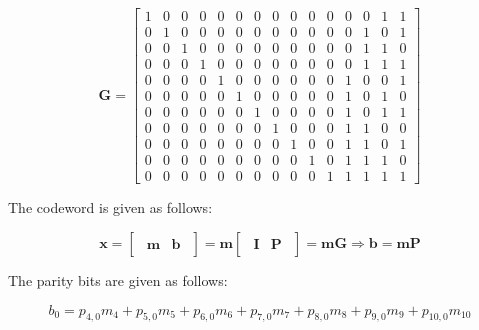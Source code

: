 \documentclass[fleqn]{article}
\begin{document}
\begin{enumerate}
\begin{enumerate}
			\begin{equation*}
				\mathbf{G} = \begin{bmatrix}
					1 & 0 & 0 & 0 & 0 & 0 & 0 & 0 & 0 & 0 & 0 & 0 & 0 & 1 & 1\\
					0 & 1 & 0 & 0 & 0 & 0 & 0 & 0 & 0 & 0 & 0 & 0 & 1 & 0 & 1\\
					0 & 0 & 1 & 0 & 0 & 0 & 0 & 0 & 0 & 0 & 0 & 0 & 1 & 1 & 0\\
					0 & 0 & 0 & 1 & 0 & 0 & 0 & 0 & 0 & 0 & 0 & 0 & 1 & 1 & 1\\
					0 & 0 & 0 & 0 & 1 & 0 & 0 & 0 & 0 & 0 & 0 & 1 & 0 & 0 & 1\\
					0 & 0 & 0 & 0 & 0 & 1 & 0 & 0 & 0 & 0 & 0 & 1 & 0 & 1 & 0\\
					0 & 0 & 0 & 0 & 0 & 0 & 1 & 0 & 0 & 0 & 0 & 1 & 0 & 1 & 1\\
					0 & 0 & 0 & 0 & 0 & 0 & 0 & 1 & 0 & 0 & 0 & 1 & 1 & 0 & 0\\
					0 & 0 & 0 & 0 & 0 & 0 & 0 & 0 & 1 & 0 & 0 & 1 & 1 & 0 & 1\\
					0 & 0 & 0 & 0 & 0 & 0 & 0 & 0 & 0 & 1 & 0 & 1 & 1 & 1 & 0\\
					0 & 0 & 0 & 0 & 0 & 0 & 0 & 0 & 0 & 0 & 1 & 1 & 1 & 1 & 1
				\end{bmatrix}
			\end{equation*}
			
			The codeword is given as follows:
			
			\begin{equation*}
				\mathbf{x} = \begin{bmatrix}{\begin{array}{c|c}
					\mathbf{m} & \mathbf{b}			
				\end{array}}\end{bmatrix} = \mathbf{m}\begin{bmatrix}
					\begin{array}{c|c}
						\mathbf{I} & \mathbf{P}
					\end{array}
				\end{bmatrix} = \mathbf{mG} 
				\Rightarrow \mathbf{b} = \mathbf{mP}
			\end{equation*}
			
			The parity bits are given as follows:
			
			\begin{equation*}
				b_0 = p_{4,0}m_{4} + p_{5,0}m_{5} + p_{6,0}m_{6} + p_{7,0}m_{7} + p_{8,0}m_{8} + p_{9,0}m_{9} + p_{10,0}m_{10}
			\end{equation*}
			

\end{enumerate}
\end{enumerate}
\end{document}
